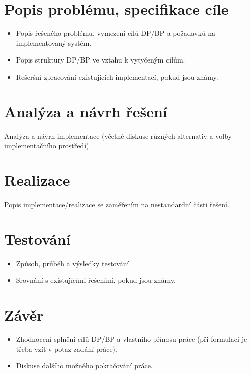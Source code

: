 \documentclass[11pt,twoside,a4paper]{book}
\begin{document}



\chapter{Popis problému, specifikace cíle}

\begin{itemize}
\item Popis řešeného problému, vymezení cílů DP/BP a požadavků na implementovaný systém.
\item Popis struktury DP/BP ve vztahu k vytyčeným cílům.
\item Rešeršní zpracování existujících implementací, pokud jsou známy.
\end{itemize}

\chapter{Analýza a návrh řešení}
Analýza a návrh implementace (včetně diskuse různých alternativ a volby implementačního prostředí).


\chapter{Realizace}
Popis implementace/realizace se zaměřením na nestandardní části řešení.


\chapter{Testování}

\begin{itemize}
 \item Způsob, průběh a výsledky testování.
 \item Srovnání s existujícími řešeními, pokud jsou známy.
\end{itemize} 


\chapter{Závěr}

\begin{itemize}
\item Zhodnocení splnění cílů DP/BP a  vlastního přínosu práce (při formulaci je třeba vzít v potaz zadání práce).
\item Diskuse dalšího možného pokračování práce.
\end{itemize} 
\end{document}

